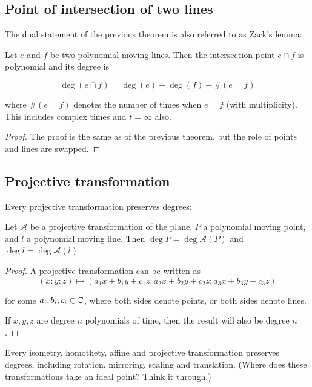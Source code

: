 \documentclass[a4paper]{article}
\begin{document}
\subsection{Point of intersection of two lines}
The dual statement of the previous theorem is also referred to as Zack's lemma:

\begin{theorem}\label{p-ll}
    Let $e$ and $f$ be two polynomial moving lines. Then the intersection point $e\cap f$ is polynomial and its degree is

$$\deg (e\cap f)= \deg (e) + \deg (f) - \# (e=f)$$

where $\# (e=f)$ denotes the number of times when $e=f$ (with multiplicity). This includes complex times and $t=\infty$ also.
\end{theorem}

\begin{proof}
    The proof is the same as of the previous theorem, but the role of points and lines are swapped.
\end{proof}
\subsection{Projective transformation}
Every projective transformation preserves degrees:
\begin{theorem} 
    Let $\mathcal{A}$ be a projective transformation of the plane, $P$ a polynomial moving point, and $l$ a polynomial moving line. Then $\deg P=\deg \mathcal{A}(P)$ and $\deg l=\deg \mathcal{A}(l)$
\end{theorem}

\begin{proof}
    A projective transformation can be written as
    \[
(x : y : z) \mapsto 
(a_1 x + b_1 y + c_1 z : 
 a_2 x + b_2 y + c_2 z : 
 a_3 x + b_3 y + c_3 z)
\]


for some $a_i, b_i, c_i \in \mathbb{C}$, where both sides denote points, or both sides denote lines.

If $x,y,z$ are degree $n$ polynomials of time, then the result will also be degree $n$.

\end{proof}
\begin{corollary}
    Every isometry, homothety, affine and projective transformation preserves degrees, including rotation, mirroring, scaling and translation. (Where does these transformations take an ideal point? Think it through.)
\end{corollary}
\end{document}
